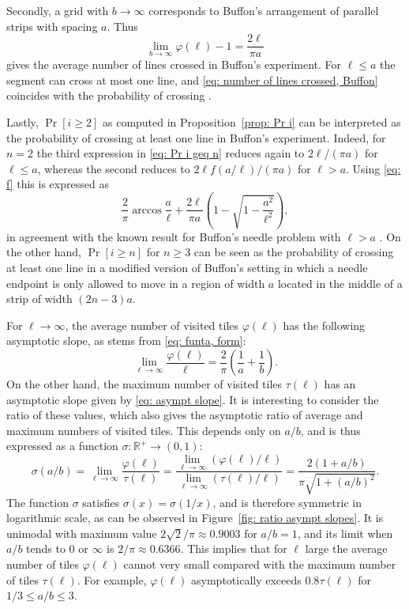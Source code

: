 \documentclass[12pt, a4paper]{article}
\newcommand{\funt}{\tau} %
\newcommand{\funta}{\varphi} %
\newcommand{\ras}{\sigma}
\newcommand{\len}{\ell} %
\begin{document}
Secondly, a grid with $b \rightarrow \infty$ corresponds to Buffon's arrangement of parallel strips with spacing $a$. Thus
\begin{equation}
\label{eq: number of lines crossed, Buffon}
\lim_{b \rightarrow \infty} \funta(\len)-1 = \frac{2\len}{\pi a}
\end{equation}
gives the average number of lines crossed in Buffon's experiment. For $\len \leq a$ the segment can cross at most one line, and \eqref{eq: number of lines crossed, Buffon} coincides with the probability of crossing \cite[theorem 1.1.1]{Mathai99}.

Lastly, $\Pr[i \geq 2]$ as computed in Proposition~\ref{prop: Pr i} can be interpreted as the probability of crossing at least one line in Buffon's experiment. Indeed, for $n=2$ the third expression in \eqref{eq: Pr i geq n} reduces again to $2\len/(\pi a)$ for $\len \leq a$, whereas the second reduces to $2\len f(a/\len)/(\pi a)$ for $\len > a$. Using \eqref{eq: f} this is expressed as
\[
\frac 2 \pi \arccos\frac a \len + \frac{2\len}{\pi a} \left(1 - \sqrt{1-\frac{a^2}{\len^2}} \right),
\]
in agreement with the known result for Buffon's needle problem with $\len > a$ \cite[theorem 1.1.2]{Mathai99}. On the other hand, $\Pr[i \geq n]$ for $n \geq 3$ can be seen as the probability of crossing at least one line in a modified version of Buffon's setting in which a needle endpoint is only allowed to move in a region of width $a$ located in the middle of a strip of width $(2n-3)a$. 

For $\len \rightarrow \infty$, the average number of visited tiles $\funta(\len)$ has the following asymptotic slope, as stems from \eqref{eq: funta, form}:
\begin{equation}
\label{eq: asympt slope ave}
\lim_{\len \rightarrow \infty} \frac{\funta(\len)}{\len} = \frac 2 \pi \left(\frac 1 a + \frac 1 b \right).
\end{equation}
On the other hand, the maximum number of visited tiles $\funt(\len)$ has an asymptotic slope given by \eqref{eq: asympt slope}. It is interesting to consider the ratio of these values, which also gives the asymptotic ratio of average and maximum numbers of visited tiles. This depends only on $a/b$, and is thus expressed as a function $\ras: \mathbb R^+ \to (0,1)$:
\begin{equation}
\label{eq: ras}
\ras(a/b) = \lim_{\len \rightarrow \infty}
\frac { \funta(\len) } { \funt(\len) }
= \frac
{ \lim_{\len \rightarrow \infty} (\funta(\len)/\len) }
{ \lim_{\len \rightarrow \infty} (\funt(\len)/\len) }
= \frac{2\left(1 + a/b\right)}{\pi\sqrt{1 + \left(a/b\right)^2}}.
\end{equation}
The function $\ras$ satisfies $\ras(x) = \ras(1/x)$, and is therefore symmetric in logarithmic scale, as can be observed in Figure~\ref{fig: ratio asympt slopes}. It is unimodal with maximum value $2\sqrt 2/\pi \approx 0.9003$ for $a/b=1$, and its limit when $a/b$ tends to $0$ or $\infty$ is $2/\pi \approx 0.6366$. This implies that for $\len$ large the average number of tiles $\funta(\len)$ cannot very small compared with the maximum number of tiles $\funt(\len)$. For example, $\funta(\len)$ asymptotically exceeds $0.8\funt(\len)$ for $1/3 \leq a/b \leq 3$.
\end{document}
